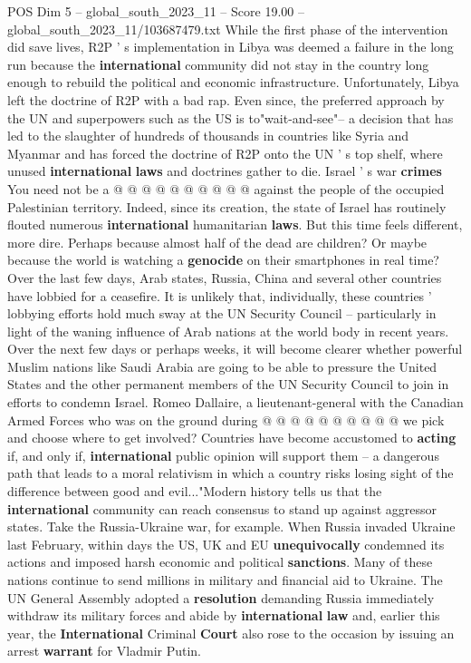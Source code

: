 \begin{textsample}{POS Dim 5 – global\_south\_2023\_11 – Score 19.00 – global\_south\_2023\_11/103687479.txt}
While the first phase of the intervention did save lives, R2P ' s implementation in Libya was deemed a failure in the long run because the \textbf{international} community did not stay in the country long enough to rebuild the political and economic infrastructure.
Unfortunately, Libya left the doctrine of R2P with a bad rap.
Even since, the preferred approach by the UN and superpowers such as the US is to"wait-and-see"-- a decision that has led to the slaughter of hundreds of thousands in countries like Syria and Myanmar and has forced the doctrine of R2P onto the UN ' s top shelf, where unused \textbf{international} \textbf{laws} and doctrines gather to die.
Israel ' s war \textbf{crimes} You need not be a @ @ @ @ @ @ @ @ @ @ against the people of the occupied Palestinian territory.
Indeed, since its creation, the state of Israel has routinely flouted numerous \textbf{international} humanitarian \textbf{laws}.
But this time feels different, more dire.
Perhaps because almost half of the dead are children?
Or maybe because the world is watching a \textbf{genocide} on their smartphones in real time?
Over the last few days, Arab states, Russia, China and several other countries have lobbied for a ceasefire.
It is unlikely that, individually, these countries ' lobbying efforts hold much sway at the UN Security Council -- particularly in light of the waning influence of Arab nations at the world body in recent years.
Over the next few days or perhaps weeks, it will become clearer whether powerful Muslim nations like Saudi Arabia are going to be able to pressure the United States and the other permanent members of the UN Security Council to join in efforts to condemn Israel.
Romeo Dallaire, a lieutenant-general with the Canadian Armed Forces who was on the ground during @ @ @ @ @ @ @ @ @ @ we pick and choose where to get involved?
Countries have become accustomed to \textbf{acting} if, and only if, \textbf{international} public opinion will support them -- a dangerous path that leads to a moral relativism in which a country risks losing sight of the difference between good and evil..."Modern history tells us that the \textbf{international} community can reach consensus to stand up against aggressor states.
Take the Russia-Ukraine war, for example.
When Russia invaded Ukraine last February, within days the US, UK and EU \textbf{unequivocally} condemned its actions and imposed harsh economic and political \textbf{sanctions}.
Many of these nations continue to send millions in military and financial aid to Ukraine.
The UN General Assembly adopted a \textbf{resolution} demanding Russia immediately withdraw its military forces and abide by \textbf{international} \textbf{law} and, earlier this year, the \textbf{International} Criminal \textbf{Court} also rose to the occasion by issuing an arrest \textbf{warrant} for Vladmir Putin.

\end{textsample}

